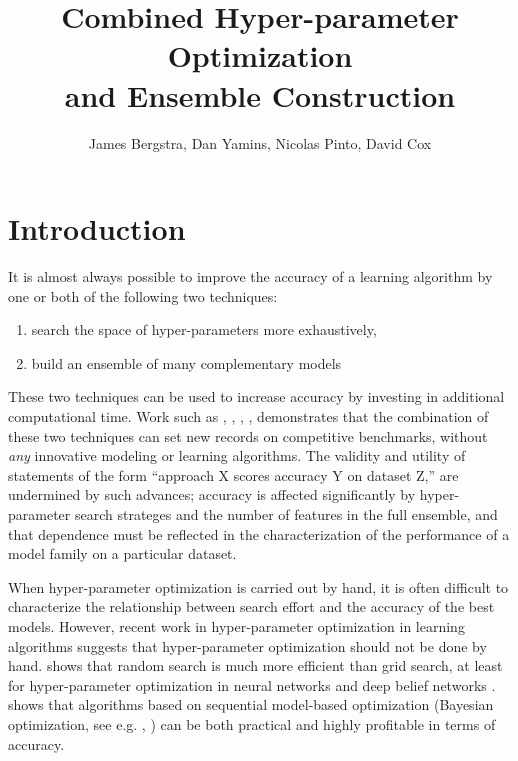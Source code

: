 \documentclass[11pt,twocolumn]{article}
\title{Combined Hyper-parameter Optimization\\and Ensemble Construction}
\author{James Bergstra, Dan Yamins, Nicolas Pinto, David Cox}
\begin{document}
\maketitle


\section{Introduction}

It is almost always possible to improve the accuracy of a learning
algorithm by one or both of the following two techniques:
\begin{enumerate}
 \item search the space of hyper-parameters more exhaustively,
 \item build an ensemble of many complementary models
\end{enumerate}

\vspace{11pt}
These two techniques can be used to increase accuracy by investing in
additional computational time.
Work such as
\citet{plos_ht}, \citet{fg11}, \citet{coates+lee+ng:2010},
\citet{gehler}, \citet{bergstra+bardenet+bengio+kegl:2011}
demonstrates that the combination of these two techniques can set new
records on competitive benchmarks, without \emph{any} innovative modeling or
learning algorithms.  The validity and utility of statements of the form
``approach X scores accuracy Y on dataset Z,'' are undermined by such
advances; accuracy is affected significantly by hyper-parameter search
strateges and the number of features in the full ensemble, and that
dependence must be reflected in the characterization of the performance
of a model family on a particular dataset.

\vspace{11pt}
When hyper-parameter optimization is carried out by hand, it is often
difficult to characterize the relationship between search effort and the
accuracy of the best models. However, recent work in hyper-parameter
optimization in learning algorithms suggests that hyper-parameter
optimization should not be done by hand.
\citet{bergstra+bengio:2012} shows that random search is much more
efficient than grid search, at least for hyper-parameter optimization in
neural networks and deep belief networks
\citep{hinton+osinero+teh:2006}.
\citet{bergstra+bardenet+bengio+kegl:2011} shows that algorithms based on
sequential model-based optimization (Bayesian optimization,
see e.g. \citep{hutter:2006}, \citet{brochu:2008})
can be both practical and highly profitable in terms of accuracy.
\end{document}
